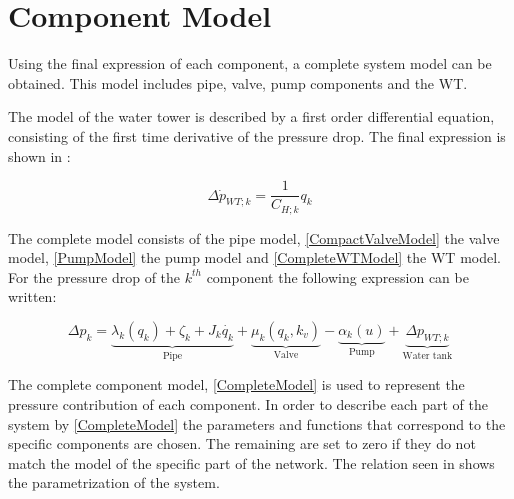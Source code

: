 \section{Component Model} 
\label{CompleteSystemModel}

Using the final expression of each component, a complete system model can be obtained. This model includes pipe, valve, pump components and the WT. 

The model of the water tower is described by a first order differential equation, consisting of the first time derivative of the pressure drop. The final expression is shown in :

\begin{equation}
  \label{CompleteWTModel}
  \Delta \dot{p}_{WT;k} = \frac{1}{C_{H;k}} q_k 
\end{equation}

The complete model consists of the pipe model, \eqref{CompactValveModel} the valve model, \eqref{PumpModel} the pump model and \eqref{CompleteWTModel} the WT model. For the pressure drop of the $k^{th}$ component the following expression can be written: 

%

\begin{equation}
\label{CompleteModel}
\Delta p_k = \underbrace{\lambda_k (q_k) + \zeta_k + J_k \dot{q_k}}_\text{Pipe} + \underbrace{\mu_k (q_k, k_v)}_\text{Valve} - \underbrace{\alpha_k(u)}_\text{Pump} + \underbrace{\Delta p_{WT;k}}_\text{Water tank}
\end{equation}

The complete component model, \eqref{CompleteModel} is used to represent the pressure contribution of each component. In order to describe each part of the system by \eqref{CompleteModel} the parameters and functions that correspond to the specific components are chosen. The remaining are set to zero if they do not match the model of the specific part of the network. 
The relation seen in  shows the parametrization of the system.

